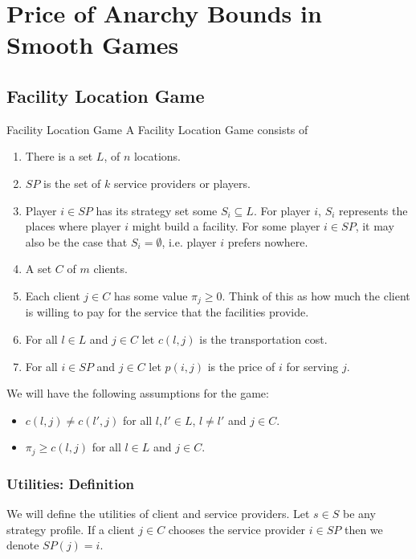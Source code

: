 \chapter{Price of Anarchy Bounds in Smooth Games}
\section{Facility Location Game}
\begin{definition}{Facility Location Game}{}
	A Facility Location Game consists of \begin{enumerate}[label=(\roman*)]
		\item There is a set $L$, of $n$ locations.
		\item $SP$ is the set of $k$ service providers or players.
		\item Player $i\in SP$ has its strategy set some $S_i\subseteq L$. For player $i$, $S_i$ represents the places where player $i$ might build a facility. For some player $i\in SP$, it may also be the case that $S_i=\emptyset$, i.e. player $i$ prefers nowhere.
		\item A set $C$ of $m$ clients. 
		\item Each client $j\in C$ has some value $\pi_j\geq 0$. Think of this as how much the client is willing to pay for the service that the facilities provide.
		\item For all $l\in L$ and $j\in C$ let $c(l,j)$ is the transportation cost.
		\item For all $i\in SP$ and $j\in C$ let $p(i,j)$ is the price of $i$ for serving $j$.
	\end{enumerate}
\end{definition}


\begin{assumption}We will have the following assumptions for the game:
	\begin{itemize}
		\item $c(l,j)\neq c(l',j)$ for all $l,l'\in L$, $l\neq l'$ and $j\in C$.
		\item $\pi_j\geq c(l,j)$ for all $l\in L$ and $j\in C$.
	\end{itemize}
\end{assumption}
\subsection{Utilities: Definition}
We will define the utilities of client and service providers. Let $s\in S$ be any strategy profile. If a client $j\in C$ chooses the service provider $i\in SP$  then we denote $SP(j)=i$. 

